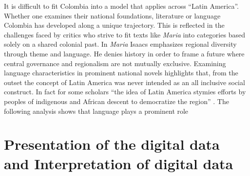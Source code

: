 \documentclass[12pt]{report}
\begin{document}
It is difficult to fit Colombia into a model that applies across \enquote{Latin America}. Whether one examines their national foundations, literature or language Colombia has developed along a unique trajectory. This is reflected in the challenges faced by critics who strive to fit texts like \textit{Maria} into categories based solely on a shared colonial past. In \textit{Maria} Isaacs emphasizes regional diversity through theme and language. He denies history in order to frame a future where central governance and regionalism are not mutually exclusive. Examining language characteristics in prominent national novels highlights that, from the outset the concept of Latin America was never intended as an all inclusive social construct. In fact for some scholars \enquote{the idea of Latin America stymies efforts by peoples of indigenous and African descent to democratize the region} \autocite[1347]{Gobat2013}. The  following analysis shows that language plays a prominent role 



\section{Presentation of the digital data and Interpretation of digital data}
\end{document}
